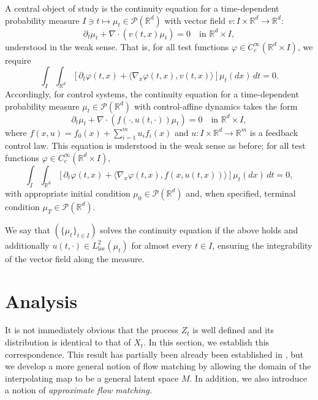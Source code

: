 \documentclass{article}
\begin{document}
A central object of study is the continuity equation for a
time-dependent probability measure
$I \ni t \mapsto \mu_t \in \mathcal{P}(\mathbb{R}^d)$ with vector field
$v: I \times \mathbb{R}^d \to \mathbb{R}^d$:
\begin{equation}
    \partial_t \mu_t + \nabla \cdot (v(t,x) \mu_t) = 0
    \quad \text{in } \mathbb{R}^d \times I,
\end{equation}
understood in the weak sense. That is, for all test functions
$\varphi \in C^\infty_c(\mathbb{R}^d \times I)$, we require
\begin{equation}
    \int_I \int_{\mathbb{R}^d} \left[
    \partial_t \varphi(t,x) +
    \langle \nabla_x \varphi(t,x), v(t,x) \rangle \right]
    \mu_t(dx) \, dt = 0.
\end{equation}
Accordingly, for control systems, the continuity equation for a
time-dependent probability measure
$\mu_t \in \mathcal{P}(\mathbb{R}^d)$ with control-affine dynamics
takes the form
\begin{equation}\label{eq:continuity}
    \partial_t \mu_t +
    \nabla \cdot (f(\cdot, u(t,\cdot)) \mu_t) = 0
    \quad \text{in } \mathbb{R}^d \times I,
\end{equation}
where $f(x,u) = f_0(x) + \sum_{i=1}^m u_i f_i(x)$ and
$u: I \times \mathbb{R}^d \rightarrow \mathbb{R}^m$ is a feedback
control law. This equation is understood in the weak sense as
before; for all test functions
$\varphi \in C^\infty_c(\mathbb{R}^d \times I)$,
\begin{equation}\label{eq:weak-continuity}
    \int_I \int_{\mathbb{R}^d} \left[
    \partial_t \varphi(t,x) +
    \langle \nabla_x \varphi(t,x), f(x, u(t,x)) \rangle \right]
    \mu_t(dx) \, dt = 0,
\end{equation}
with appropriate initial condition
$\mu_0 \in \mathcal{P}(\mathbb{R}^d)$ and, when specified,
terminal condition $\mu_T \in \mathcal{P}(\mathbb{R}^d)$.

We say that $(\{\mu_t\}_{t \in I})$ solves the continuity equation
if the above holds and additionally
$u(t,\cdot) \in L^2_{\text{loc}}(\mu_t)$ for almost every $t \in I$,
ensuring the integrability of the vector field along the measure.


\section{Analysis}
It is not immediately obvious that the process $Z_t$ is well defined and its distribution is identical to that of $X_t$. In this section, we establish this correspondence. This result has partially been already been established in \cite{elamvazhuthi2024benamou}, but we develop a more general notion of flow matching by allowing the domain of the interpolating map to be a general latent space $M$. In addition, we also introduce a notion of {\it approximate flow matching.}
\end{document}
